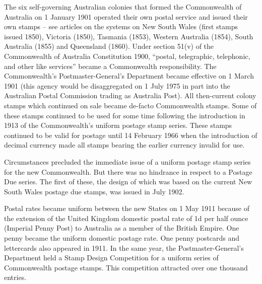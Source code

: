 \documentclass[justified]{tufte-book}
\begin{document}
The six self-governing Australian colonies that formed the Commonwealth of Australia on 1 January 1901 operated their own postal service and issued their own stamps – see articles on the systems on New South Wales (first stamps issued 1850), Victoria (1850), Tasmania (1853), Western Australia (1854), South Australia (1855) and Queensland (1860). Under section 51(v) of the Commonwealth of Australia Constitution 1900, “postal, telegraphic, telephonic, and other like services” became a Commonwealth responsibility.
The Commonwealth's Postmaster-General's Department became effective on 1 March 1901 (this agency would be disaggregated on 1 July 1975 in part into the Australian Postal Commission trading as Australia Post). All then-current colony stamps which continued on sale became de-facto Commonwealth stamps. Some of these stamps continued to be used for some time following the introduction in 1913 of the Commonwealth's uniform postage stamp series. These stamps continued to be valid for postage until 14 February 1966 when the introduction of decimal currency made all stamps bearing the earlier currency invalid for use.

Circumstances precluded the immediate issue of a uniform postage stamp series for the new Commonwealth. But there was no hindrance in respect to a Postage Due series. The first of these, the design of which was based on the current New South Wales postage due stamps, was issued in July 1902.

Postal rates became uniform between the new States on 1 May 1911 because of the extension of the United Kingdom domestic postal rate of 1d per half ounce (Imperial Penny Post) to Australia as a member of the British Empire. One penny became the uniform domestic postage rate. One penny postcards and lettercards also appeared in 1911. In the same year, the Postmaster-General's Department held a Stamp Design Competition for a uniform series of Commonwealth postage stamps. This competition attracted over one thousand entries.







\pagebreak






\end{document}
